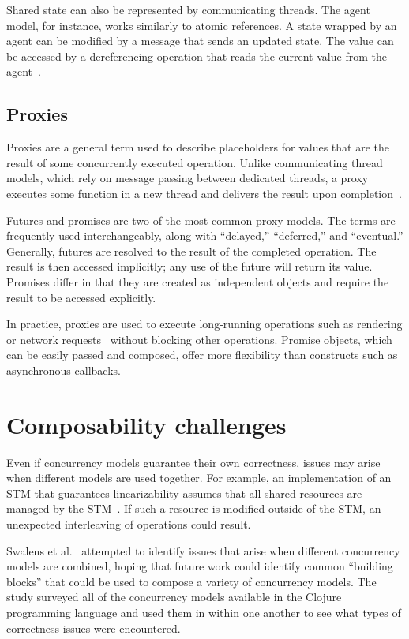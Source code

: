 \documentclass{sig-alternate}
\begin{document}
Shared state can also be represented by communicating threads. The agent model, for instance, works similarly to atomic references. A state wrapped by an agent can be modified by a message that sends an updated state. The value can be accessed by a dereferencing operation that reads the current value from the agent~\cite{Swalens2014}.

\subsection{Proxies}

Proxies are a general term used to describe placeholders for values that are the result of some concurrently executed operation. Unlike communicating thread models, which rely on message passing between dedicated threads, a proxy executes some function in a new thread and delivers the result upon completion~\cite{Swalens2014}.

Futures and promises are two of the most common proxy models. The terms are frequently used interchangeably, along with ``delayed,'' ``deferred,'' and ``eventual.'' Generally, futures are resolved to the result of the completed operation. The result is then accessed implicitly; any use of the future will return its value. Promises differ in that they are created as independent objects and require the result to be accessed explicitly.

In practice, proxies are used to execute long-running operations such as rendering or network requests~\cite{Swalens2014} without blocking other operations. Promise objects, which can be easily passed and composed, offer more flexibility than constructs such as asynchronous callbacks.

\section{Composability challenges}

Even if concurrency models guarantee their own correctness, issues may arise when different models are used together. For example, an implementation of an STM that guarantees linearizability assumes that all shared resources are managed by the STM~\cite{Shavit1995}. If such a resource is modified outside of the STM, an unexpected interleaving of operations could result.

Swalens et al.~\cite{Swalens2014} attempted to identify issues that arise when different concurrency models are combined, hoping that future work could identify common ``building blocks'' that could be used to compose a variety of concurrency models. The study surveyed all of the concurrency models available in the Clojure programming language and used them in within one another to see what types of correctness issues were encountered.
\end{document}
